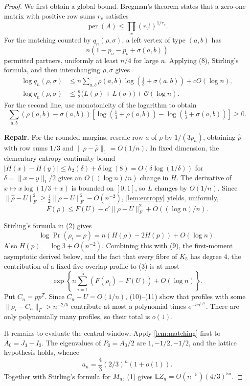 \documentclass[11pt,a4paper]{article}
\theoremstyle{plain}
\theoremstyle{definition}
\theoremstyle{remark}
\newcommand{\E}{\mathbb E}
\newcommand{\cO}{\mathcal O}
\newcommand{\per}{\operatorname{per}}
\newcommand{\repair}[1]{\begin{tcolorbox}[colback=yellow!7,colframe=gray!60,boxrule=0.3pt,arc=1pt,left=5pt,right=5pt,top=3pt,bottom=3pt]\small\textbf{Repair.} #1\end{tcolorbox}}
\begin{document}
\label{pf:second}
\propsecond*
\begin{proof}
We first obtain a global bound.  Bregman's theorem states that a zero-one matrix with
positive row sums $r_v$ satisfies
\[
 \per(A)\le\prod_v(r_v!)^{1/r_v}.                               \tag{8}
\]
For the matching counted by $q_n(\rho,\sigma)$, a left vertex of type $(a,b)$ has
\[
 n(1-p_a-p_b+\sigma(a,b))
\]
permitted partners, uniformly at least $n/4$ for large $n$.  Applying (8), Stirling's
formula, and then interchanging $\rho,\sigma$ gives
\begin{align*}
 \log q_n(\rho,\sigma)
 &\le n\sum_{a,b}\rho(a,b)\log(\tfrac13+\sigma(a,b))+cO(\log n),\\
 \log q_n(\rho,\sigma)
 &\le \frac n2\bigl(L(\rho)+L(\sigma)\bigr)+\cO(\log n).       \tag{9}
\end{align*}
For the second line, use monotonicity of the logarithm to obtain
\[
 \sum_{a,b}(\rho(a,b)-\sigma(a,b))
 [\log(\tfrac13+\rho(a,b))-\log(\tfrac13+\sigma(a,b))]\ge0.
\]

\repair{For the rounded margins, rescale row $a$ of $\rho$ by $1/(3p_a)$, obtaining
$\widehat\rho$ with row sums $1/3$ and
$\|\rho-\widehat\rho\|_1=O(1/n)$.  In fixed dimension, the elementary entropy
continuity bound
$|H(x)-H(y)|\le h_2(\delta)+\delta\log(8)=O(\delta\log(1/\delta))$ for
$\delta=\|x-y\|_1/2$ gives an $O((\log n)/n)$ change in $H$.  The derivative of
$x\mapsto x\log(1/3+x)$ is bounded on $[0,1]$, so $L$ changes by $O(1/n)$.  Since
$\|\widehat\rho-U\|_F^2\ge\tfrac12\|\rho-U\|_F^2-O(n^{-2})$,
\cref{lem:entropy} yields, uniformly,
\[
 F(\rho)\le F(U)-c'\|\rho-U\|_F^2+O((\log n)/n).                \tag{10}
\]}

Stirling's formula in (2) gives
\[
 \log\Pr(\rho_i=\rho)=n(H(\rho)-2H(p))+O(\log n).
\]
Also $H(p)=\log3+O(n^{-2})$.  Combining this with (9), the first-moment asymptotic
derived below, and the fact that every fibre of $K_5$ has degree $4$, the contribution
of a fixed five-overlap profile to (3) is at most
\[
 \exp\left\{n\sum_{i=1}^5(F(\rho_i)-F(U))+O(\log n)\right\}.    \tag{11}
\]
Put $C_n=pp^{T}$.  Since $C_n-U=O(1/n)$, (10)--(11) show that profiles with some
$\|\rho_i-C_n\|_F>n^{-2/5}$ contribute at most a polynomial times
$e^{-cn^{1/5}}$.  There are only polynomially many profiles, so their total is $o(1)$.

It remains to evaluate the central window.  Apply \cref{lem:matching} first to
$A_0=J_3-I_3$.  The eigenvalues of $P_0=A_0/2$ are $1,-1/2,-1/2$, and the lattice
hypothesis holds, whence
\[
 a_n=\frac43(2/3)^n(1+o(1)).                                  \tag{12}
\]
Together with Stirling's formula for $M_n$, (1) gives
$\E Z_n=\Theta(n^{-5})(4/3)^{5n}$.


\end{proof}
\end{document}
